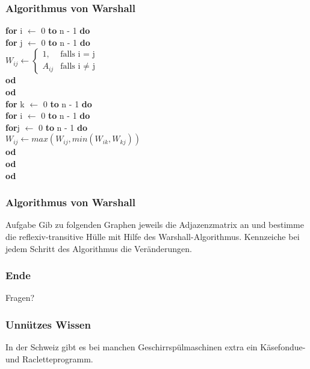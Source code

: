 \documentclass{beamer}
\begin{document}
\begin{frame}
	\frametitle{Algorithmus von Warshall}

	\hspace{0.5 cm} \textbf{for} i $\leftarrow$ 0 \textbf{to} n - 1 \textbf{do} \\
	\hspace{1 cm} \textbf{for} j $\leftarrow$ 0 \textbf{to} n - 1 \textbf{do} \\
	\hspace{1.5 cm}	$W_{ij} \leftarrow 
			\begin{cases}
				1,  & \text{falls i = j}\\
				 A_{ij}  & \text{falls i $\ne$ j}
			\end{cases}$ \\
	\hspace{1 cm} \textbf{od}\\
	\hspace{0.5 cm} \textbf{od}\\
	\vspace{0.5 cm}
	\hspace{0.5 cm} \textbf{for} k $\leftarrow$ 0 \textbf{to} n - 1 \textbf{do} \\
	\hspace{1 cm} \textbf{for} i $\leftarrow$ 0 \textbf{to} n - 1 \textbf{do} \\
	\hspace{1.5 cm} \textbf{for}j $\leftarrow$ 0 \textbf{to} n - 1 \textbf{do} \\
	\hspace{2 cm} $W_{ij} \leftarrow max( W_{ij}, min(W_{ik}, W_{kj}) )$\\
	\hspace{1.5 cm} \textbf{od}	\\
	\hspace{1 cm} \textbf{od}	\\
	\hspace{0.5 cm} \textbf{od}	
\end{frame}

\begin{frame}
	\frametitle{Algorithmus von Warshall}
	\begin{block}{Aufgabe}
	Gib zu folgenden Graphen jeweils die Adjazenzmatrix an und bestimme die 
	reflexiv-transitive H\"ulle mit Hilfe des Warshall-Algorithmus. Kennzeiche 
	bei jedem Schritt des Algorithmus die Ver\"anderungen.
	\end{block}
\end{frame}


\begin {frame}
\frametitle {Ende}
	\begin {center}
		Fragen?
	\end {center}
\end {frame}

\begin {frame}
\frametitle {Unnützes Wissen}
	\begin {center}
		In der Schweiz gibt es bei manchen Geschirrspülmaschinen extra ein Käsefondue- und Racletteprogramm.	
	\end {center}
\end {frame}
\end{document}
